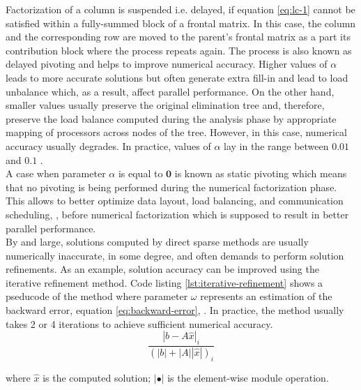 Factorization of a column is suspended i.e. delayed, if equation \ref{eq:lc-1} cannot be satisfied within a fully-summed block of a frontal matrix. In this case, the column and the corresponding row are moved to the parent's frontal matrix as a part its contribution block where the process repeats again. The process is also known as delayed pivoting and helps to improve numerical accuracy. Higher values of $\alpha$ leads to more accurate solutions but often generate extra fill-in and lead to load unbalance which, as a result, affect parallel performance. On the other hand, smaller values usually preserve the original elimination tree and, therefore,  preserve the load balance computed during the analysis phase by appropriate mapping of processors across nodes of the tree. However, in this case, numerical accuracy usually degrades. In practice, values of $\alpha$ lay in the range between $0.01$ and $0.1$ \cite{mumps-manual}.\\



A case when parameter $\alpha$ is equal to $\bm{0}$ is known as static pivoting which means that no pivoting is being performed during the numerical factorization phase. This allows to better optimize data layout, load balancing, and communication scheduling, \cite{superlu-manual}, before numerical factorization which is supposed to result in better parallel performance.\\



By and large, solutions computed by direct sparse methods are usually numerically inaccurate, in some degree, and often demands to perform solution refinements. As an example, solution accuracy can be improved using the iterative refinement method. Code listing \ref{lst:iterative-refinement} shows a pseducode of the method where parameter $\omega$ represents an estimation of the backward error, equation \ref{eq:backward-error}, \cite{mm-backward-error}. In practice, the method usually takes 2 or 4 iterations to achieve sufficient numerical accuracy.\\

\begin{equation} \label{eq:backward-error}
\frac{|b - A\hat{x}|_{i}}{(|b| + |A| |\hat{x}|)_{i}}
\end{equation}

where $\hat{x}$ is the computed solution; $|\bullet|$ is the element-wise module operation.\\


